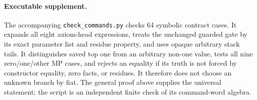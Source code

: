 \paragraph{Executable supplement.}
The accompanying \texttt{check\_commands.py} checks 64 symbolic contract
cases.  It expands all eight axiom-head expressions, treats the unchanged
guarded gate by its exact parameter list and residue property, and uses
opaque arbitrary stack tails.  It distinguishes saved top one from an
arbitrary non-one value, tests all nine zero/one/other MP cases, and rejects
an equality if its truth is not forced by constructor equality, zero facts,
or residues.  It therefore does not choose an unknown branch by fiat.
The general proof above supplies the universal statement; the script is
an independent finite check of its command-word algebra.
